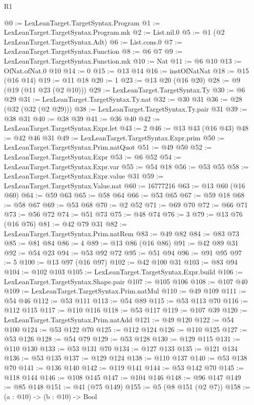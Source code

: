 \begin{lexlean}{R1}
\begin{coremodule}
@0 := LexLeanTarget.TargetSyntax.Program
@1 := LexLeanTarget.TargetSyntax.Program.mk
@2 := List.nil.{0}
@5 := @1 (@2 LexLeanTarget.TargetSyntax.Adt)
@6 := List.cons.{0}
@7 := LexLeanTarget.TargetSyntax.Function
@8 := @6 @7
@9 := LexLeanTarget.TargetSyntax.Function.mk
@10 := Nat
@11 := @6 @10
@13 := OfNat.ofNat.{0} @10
@14 := 0
@15 := @13 @14
@16 := instOfNatNat
@18 := @15 (@16 @14)
@19 := @11 @18
@20 := 1
@23 := @13 @20 (@16 @20)
@28 := @9 (@19 (@11 @23 (@2 @10)))
@29 := LexLeanTarget.TargetSyntax.Ty
@30 := @6 @29
@31 := LexLeanTarget.TargetSyntax.Ty.nat
@32 := @30 @31
@36 := @28 (@32 (@32 (@2 @29)))
@38 := LexLeanTarget.TargetSyntax.Ty.pair @31
@39 := @38 @31
@40 := @38 @39
@41 := @36 @40
@42 := LexLeanTarget.TargetSyntax.Expr.let
@43 := 2
@46 := @13 @43 (@16 @43)
@48 := @42 @46 @31
@49 := LexLeanTarget.TargetSyntax.Expr.prim
@50 := LexLeanTarget.TargetSyntax.Prim.natQuot
@51 := @49 @50
@52 := LexLeanTarget.TargetSyntax.Expr
@53 := @6 @52
@54 := LexLeanTarget.TargetSyntax.Expr.var
@55 := @54 @18
@56 := @53 @55
@58 := LexLeanTarget.TargetSyntax.Expr.value @31
@59 := LexLeanTarget.TargetSyntax.Value.nat
@60 := 16777216
@63 := @13 @60 (@16 @60)
@64 := @59 @63
@65 := @58 @64
@66 := @53 @65
@67 := @59 @18
@68 := @58 @67
@69 := @53 @68
@70 := @2 @52
@71 := @69 @70
@72 := @66 @71
@73 := @56 @72
@74 := @51 @73
@75 := @48 @74
@76 := 3
@79 := @13 @76 (@16 @76)
@81 := @42 @79 @31
@82 := LexLeanTarget.TargetSyntax.Prim.natRem
@83 := @49 @82
@84 := @83 @73
@85 := @81 @84
@86 := 4
@89 := @13 @86 (@16 @86)
@91 := @42 @89 @31
@92 := @54 @23
@94 := @53 @92 @72
@95 := @51 @94
@96 := @91 @95
@97 := 5
@100 := @13 @97 (@16 @97)
@102 := @42 @100 @31
@103 := @83 @94
@104 := @102 @103
@105 := LexLeanTarget.TargetSyntax.Expr.build
@106 := LexLeanTarget.TargetSyntax.Shape.pair
@107 := @105 @106
@108 := @107 @40
@109 := LexLeanTarget.TargetSyntax.Prim.natMul
@110 := @49 @109
@111 := @54 @46
@112 := @53 @111
@113 := @54 @89
@115 := @53 @113 @70
@116 := @112 @115
@117 := @110 @116
@118 := @53 @117
@119 := @107 @39
@120 := LexLeanTarget.TargetSyntax.Prim.natAdd
@121 := @49 @120
@122 := @54 @100
@124 := @53 @122 @70
@125 := @112 @124
@126 := @110 @125
@127 := @53 @126
@128 := @54 @79
@129 := @53 @128
@130 := @129 @115
@131 := @110 @130
@133 := @53 @131 @70
@134 := @127 @133
@135 := @121 @134
@136 := @53 @135
@137 := @129 @124
@138 := @110 @137
@140 := @53 @138 @70
@141 := @136 @140
@142 := @119 @141
@144 := @53 @142 @70
@145 := @118 @144
@146 := @108 @145
@147 := @104 @146
@148 := @96 @147
@149 := @85 @148
@151 := @41 (@75 @149)
@155 := @5 (@8 @151 (@2 @7))
@158 := (a : @10) -> (b : @10) -> Bool

\end{coremodule}
\end{lexlean}
